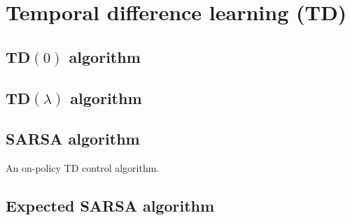 \section{Temporal difference learning (TD)}

\subsection{TD\texorpdfstring{\( (0) \)}{ (0) } algorithm}

\subsection{TD\texorpdfstring{\( (\lambda) \)}{ (lambda) } algorithm}

\subsection{SARSA algorithm}

An on-policy TD control algorithm.

\subsection{Expected SARSA algorithm}
